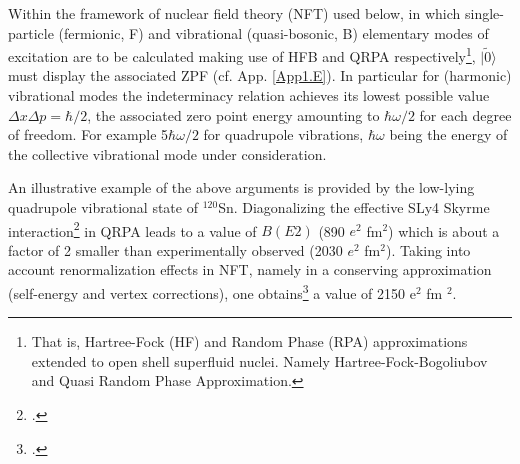 Within the framework of nuclear field theory (NFT) used below, in which single-particle (fermionic, F) and vibrational
(quasi-bosonic, B) elementary modes of excitation are to be calculated making use of HFB and QRPA
respectively\footnote{That is, Hartree-Fock (HF) and Random Phase (RPA) approximations extended to open shell superfluid nuclei. Namely Hartree-Fock-Bogoliubov and Quasi Random Phase Approximation.}, $|\tilde 0\rangle  $ must display the associated ZPF (cf. App. \ref{App1.E}). In particular for (harmonic) vibrational modes the indeterminacy relation achieves its lowest possible value 
$\Delta x \Delta p = \hbar/2$, the associated zero point energy amounting to $\hbar \omega/2$
for each degree of freedom. For example 5$\hbar \omega/2$ for quadrupole vibrations, 
$\hbar \omega$ being the energy of the collective vibrational mode under consideration. 




An illustrative example of the above arguments is provided by the low-lying quadrupole vibrational state of $^{120}$Sn. 
Diagonalizing the effective SLy4 Skyrme interaction\footnote{\cite{Ring:80}.} in QRPA leads to a value of $B(E2)$
(890 $e^2$ fm$^2$) which is about a factor of 2 smaller than experimentally observed (2030 $e^2$ fm$^2$). 
Taking into account  renormalization effects in NFT, 
namely in a conserving  approximation (self-energy and vertex corrections),   one obtains\footnote{\cite{Barranco:04}.} a value of 2150 e$^2$ fm $^2$. 


